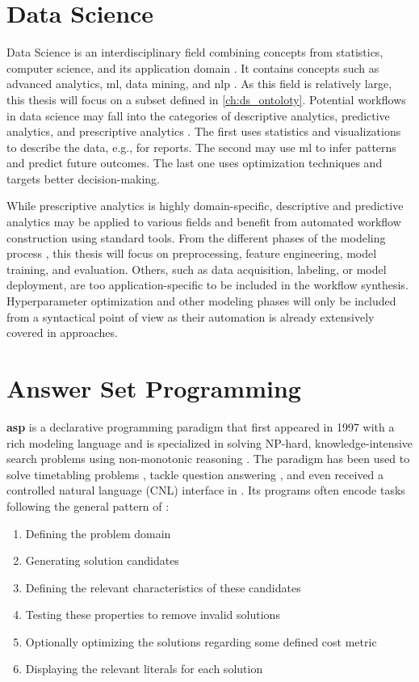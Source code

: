 \section{Data Science}
Data Science is an interdisciplinary field combining concepts from statistics, computer science, and its application domain \cite{cao2017data}. It contains concepts such as advanced analytics, \ac{ml}, data mining, and \ac{nlp} \cite{sarker2021data}. As this field is relatively large, this thesis will focus on a subset defined in \autoref{ch:ds_ontoloty}. Potential workflows in data science may fall into the categories of descriptive analytics, predictive analytics, and prescriptive analytics \cite{cao2017data}. The first uses statistics and visualizations to describe the data, e.g., for reports. The second may use \ac{ml} to infer patterns and predict future outcomes. The last one uses optimization techniques and targets better decision-making.

While prescriptive analytics is highly domain-specific, descriptive and predictive analytics may be applied to various fields and benefit from automated workflow construction using standard tools. From the different phases of the modeling process \cite{zhang2020data}, this thesis will focus on preprocessing, feature engineering, model training, and evaluation. Others, such as data acquisition, labeling, or model deployment, are too application-specific to be included in the workflow synthesis. Hyperparameter optimization and other modeling phases will only be included from a syntactical point of view as their automation is already extensively covered in \cite{he2021automl} approaches.

\section{Answer Set Programming}

\textbf{\acf{asp}} \cite{lifschitz2008answer} is a declarative programming paradigm that first appeared in 1997 with a rich modeling language and is specialized in solving NP-hard, knowledge-intensive search problems using non-monotonic reasoning \cite{Brewka2011}. The paradigm has been used to solve timetabling problems \cite{banbara2013answer}, tackle question answering \cite{mitra2016addressing}, and even received a controlled natural language (CNL) interface in \cite{guy2017peng}. Its programs often encode tasks following the general pattern of \cite{gebser2016modeling}:

\begin{enumerate}
    \item Defining the problem domain
    \item Generating solution candidates
    \item Defining the relevant characteristics of these candidates
    \item Testing these properties to remove invalid solutions
    \item Optionally optimizing the solutions regarding some defined cost metric
    \item Displaying the relevant literals for each solution
\end{enumerate}

